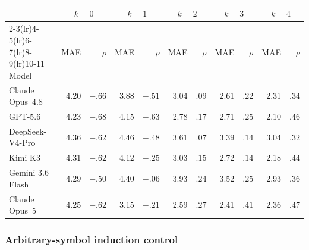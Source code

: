 \begin{center}
\begin{minipage}{\linewidth}
\centering
{}
\label{tab:coin-city-wrong-context}
\small
\setlength{\tabcolsep}{4pt}
\begin{tabular}{l rr rr rr rr rr}
\toprule
& \multicolumn{2}{c}{$k{=}0$} & \multicolumn{2}{c}{$k{=}1$} & \multicolumn{2}{c}{$k{=}2$}
& \multicolumn{2}{c}{$k{=}3$} & \multicolumn{2}{c}{$k{=}4$} \\
\cmidrule(lr){2-3}\cmidrule(lr){4-5}\cmidrule(lr){6-7}\cmidrule(lr){8-9}\cmidrule(lr){10-11}
Model & MAE & $\rho$ & MAE & $\rho$ & MAE & $\rho$ & MAE & $\rho$ & MAE & $\rho$ \\
\midrule
Claude Opus~4.8 & 4.20 & $-.66$ & 3.88 & $-.51$ & 3.04 & $.09$ & 2.61 & $.22$ & 2.31 & $.34$ \\
GPT-5.6 & 4.23 & $-.68$ & 4.15 & $-.63$ & 2.78 & $.17$ & 2.71 & $.25$ & 2.10 & $.46$ \\
DeepSeek-V4-Pro & 4.36 & $-.62$ & 4.46 & $-.48$ & 3.61 & $.07$ & 3.39 & $.14$ & 3.04 & $.32$ \\
Kimi K3 & 4.31 & $-.62$ & 4.12 & $-.25$ & 3.03 & $.15$ & 2.72 & $.14$ & 2.18 & $.44$ \\
Gemini 3.6 Flash & 4.29 & $-.50$ & 4.40 & $-.06$ & 3.93 & $.24$ & 3.52 & $.25$ & 2.93 & $.36$ \\
Claude Opus~5 & 4.25 & $-.62$ & 3.15 & $-.21$ & 2.59 & $.27$ & 2.41 & $.41$ & 2.36 & $.47$ \\
\bottomrule
\end{tabular}
\end{minipage}
\end{center}

\subsubsection{Arbitrary-symbol induction control}


